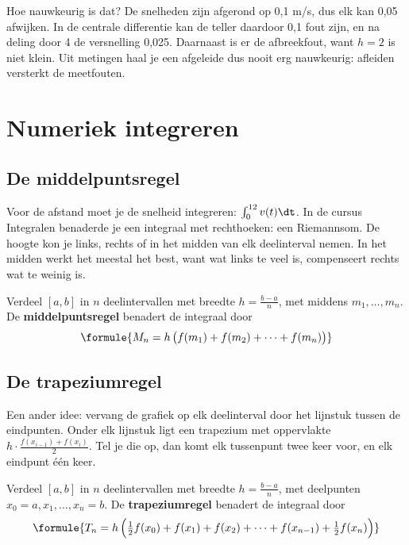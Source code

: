 Hoe nauwkeurig is dat? De snelheden zijn afgerond op 0,1 m/s, dus elk kan 0,05 afwijken. In de centrale differentie kan de teller daardoor 0,1 fout zijn, en na deling door 4 de versnelling 0,025. Daarnaast is er de afbreekfout, want $h = 2$ is niet klein. Uit metingen haal je een afgeleide dus nooit erg nauwkeurig: afleiden versterkt de meetfouten.

\begin{oefeningen}
\end{oefeningen}

\section{Numeriek integreren}

\subsection{De middelpuntsregel}

Voor de afstand moet je de snelheid integreren: $\int_0^{12} v(t)\dt$. In de cursus Integralen benaderde je een integraal met rechthoeken: een Riemannsom. De hoogte kon je links, rechts of in het midden van elk deelinterval nemen. In het midden werkt het meestal het best, want wat links te veel is, compenseert rechts wat te weinig is.

\begin{theorie}
Verdeel $[a, b]$ in $n$ deelintervallen met breedte $h = \frac{b - a}{n}$, met middens $m_1, \ldots, m_n$. De \textbf{\textcolor{accent}{middelpuntsregel}} benadert de integraal door
\[
\formule{M_n = h\,\bigl(f(m_1) + f(m_2) + \cdots + f(m_n)\bigr)}
\]
\end{theorie}

\subsection{De trapeziumregel}

Een ander idee: vervang de grafiek op elk deelinterval door het lijnstuk tussen de eindpunten. Onder elk lijnstuk ligt een trapezium met oppervlakte $h \cdot \frac{f(x_{i-1}) + f(x_i)}{2}$. Tel je die op, dan komt elk tussenpunt twee keer voor, en elk eindpunt één keer.

\begin{theorie}
Verdeel $[a, b]$ in $n$ deelintervallen met breedte $h = \frac{b - a}{n}$, met deelpunten $x_0 = a, x_1, \ldots, x_n = b$. De \textbf{\textcolor{accent}{trapeziumregel}} benadert de integraal door
\[
\formule{T_n = h\,\Bigl(\tfrac12 f(x_0) + f(x_1) + f(x_2) + \cdots + f(x_{n-1}) + \tfrac12 f(x_n)\Bigr)}
\]
\end{theorie}

